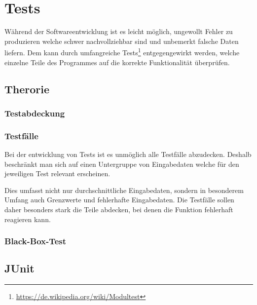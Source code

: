 

\section{Tests}

W\"ahrend der Softwareentwicklung ist es leicht m\"oglich, ungewollt Fehler zu produzieren welche schwer nachvollziehbar sind und unbemerkt falsche Daten liefern. Dem kann durch umfangreiche Tests\footnote{\url{https://de.wikipedia.org/wiki/Modultest}} entgegengewirkt werden, welche einzelne Teile des Programmes auf die korrekte Funktionalit\"at \"uberpr\"ufen.

\subsection{Therorie}

\subsubsection{Testabdeckung}

\subsubsection{Testf\"alle}

Bei der entwicklung von Tests ist es unm\"oglich alle Testf\"alle abzudecken. Deshalb beschr\"ankt man sich auf einen Untergruppe von Eingabedaten welche f\"ur den jeweiligen Test relevant erscheinen.

Dies umfasst nicht nur durchschnittliche Eingabedaten, sondern in besonderem Umfang auch Grenzwerte und fehlerhafte Eingabedaten. Die Testf\"alle sollen daher besonders stark die Teile abdecken, bei denen die Funktion fehlerhaft reagieren kann.

\subsubsection{Black-Box-Test}

\subsection{JUnit}

